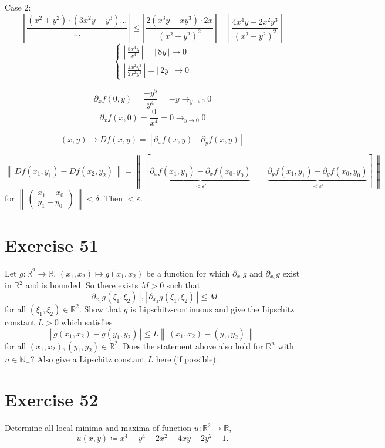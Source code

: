 \documentclass[a4paper]{article}
\theoremstyle{definition}
\newcommand\abs[1]{\left|\,#1\,\right|}
\newcommand\norm[1]{\left\|\,#1\,\right\|}
\begin{document}
Case 2:
\[
\abs{\frac{(x^2 + y^2) \cdot (3x^2y - y^3) \ldots}{\ldots}}
\leq \abs{\frac{2 (x^3 y - xy^3) \cdot 2x}{(x^2 + y^2)^2}}
= \abs{\frac{4x^4y - 2x^2 y^3}{(x^2 + y^2)^2}}
\] \[
\begin{cases}
  \abs{\frac{8x^4 y}{x^4}} = \abs{8y} \to 0 \\
  \abs{\frac{4x^2 y^3}{2x^2 y^2}} = \abs{2y} \to 0
\end{cases}
\]

\[ \partial_x f(0,y) = \frac{-y^5}{y^4} = -y \to_{y \to 0} 0 \]
\[ \partial_x f(x,0) = \frac{0}{x^4} = 0 \to_{y\to 0} 0 \]

\[ (x,y) \mapsto Df(x,y) = [\partial_x f(x,y) \quad \partial_y f(x,y)] \]

\[ \norm{Df(x_1, y_1) - Df(x_2, y_2)} = \norm{[\underbrace{\partial_x f(x_1, y_1) - \partial_x f(x_0, y_0)}_{<\varepsilon'} \qquad \underbrace{\partial_y f(x_1, y_1) - \partial_y f(x_0, y_0)}_{<\varepsilon'}]} \]
for $\norm{\begin{pmatrix} x_1 - x_0 \\ y_1 - y_0 \end{pmatrix}} < \delta$.
Then $<\varepsilon$.


\section{Exercise 51}
\begin{ex}
  Let $g: \mathbb R^2 \to \mathbb R$, $(x_1, x_2) \mapsto g(x_1, x_2)$ be a function for which $\partial_{x_1} g$ and $\partial_{x_2} g$
  exist in $\mathbb R^2$ and is bounded. So there exists $M > 0$ such that
  \[ \abs{\partial_{x_1} g(\xi_1, \xi_2)}, \abs{\partial_{x_2} g(\xi_1, \xi_2)} \leq M \]
  for all $(\xi_1, \xi_2) \in \mathbb R^2$. Show that $g$ is Lipschitz-continuous and
  give the Lipschitz constant $L > 0$ which satisfies
  \[ \abs{g(x_1, x_2) - g(y_1, y_2)} \leq L \norm{(x_1, x_2) - (y_1, y_2)} \]
  for all $(x_1, x_2), (y_1, y_2) \in \mathbb R^2$.
  Does the statement above also hold for $\mathbb R^n$ with $n \in \mathbb N_+$?
  Also give a Lipschitz constant $L$ here (if possible).
\end{ex}

\section{Exercise 52}
\begin{ex}
  Determine all local minima and maxima of function $u: \mathbb R^2 \to \mathbb R$,
  \[ u(x,y) \coloneqq x^4 + y^4 - 2x^2 + 4xy - 2y^2 - 1. \]
\end{ex}
\end{document}
